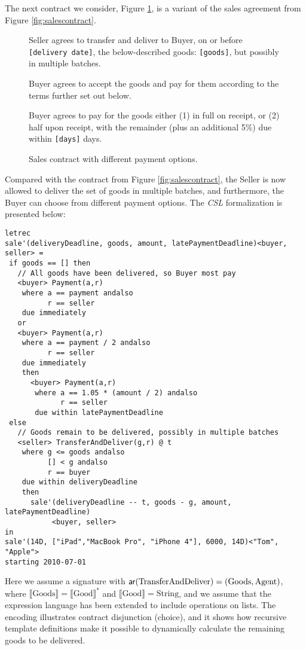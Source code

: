\documentclass[orivec,final]{llncs-href}
\newcommand{\tp}{\mathsf{ar}}
\newcommand{\dendom}[1]{\llbracket #1 \rrbracket}
\newcommand{\csl}{\textit{CSL}}
\newcounter{paragraphcounter}
\newenvironment{papercontract}
  {\begin{list}{\textbf{Paragraph \arabic{paragraphcounter}.}}{\usecounter{paragraphcounter}\leftmargin=0pt\itemindent=17pt\rightmargin=0pt\topsep=7pt\itemsep=2pt}}
  {\end{list}}
\newcommand{\contractparam}[1]{{\texttt{[#1]}}}
\begin{document}
The next contract we consider, Figure \ref{fig:salesdiff}, is a
variant of the sales agreement from Figure \ref{fig:salescontract}.
\begin{figure}[t]
  \begin{papercontract}
  \item Seller agrees to transfer and deliver to Buyer, on
    or before \contractparam{delivery date}, the below-described goods:
    \contractparam{goods}, but possibly in multiple batches.
  \item Buyer agrees to accept the goods and pay for
    them according to the terms further set out below.
  \item Buyer agrees to pay for the goods either (1) in
    full on receipt, or (2) half upon receipt, with the remainder (plus an
    additional 5\%) due within \contractparam{days} days.
  \end{papercontract}
  \caption{Sales contract with different payment options.}\label{fig:salesdiff}
\end{figure}
Compared with the contract from Figure \ref{fig:salescontract}, the
Seller is now allowed to deliver the set of goods in multiple batches,
and furthermore, the Buyer can choose from different payment
options. The \csl{} formalization is presented below:
\begin{lstlisting}[language=csl]
letrec
sale'(deliveryDeadline, goods, amount, latePaymentDeadline)<buyer, seller> =
 if goods == [] then
   // All goods have been delivered, so Buyer most pay
   <buyer> Payment(a,r)
    where a == payment andalso
          r == seller
    due immediately
   or
   <buyer> Payment(a,r)
    where a == payment / 2 andalso
          r == seller
    due immediately
    then
      <buyer> Payment(a,r)
       where a == 1.05 * (amount / 2) andalso
             r == seller
       due within latePaymentDeadline
 else
   // Goods remain to be delivered, possibly in multiple batches
   <seller> TransferAndDeliver(g,r) @ t
    where g <= goods andalso
          [] < g andalso
          r == buyer
    due within deliveryDeadline
    then
      sale'(deliveryDeadline -- t, goods - g, amount, latePaymentDeadline)
           <buyer, seller>
in
sale'(14D, ["iPad","MacBook Pro", "iPhone 4"], 6000, 14D)<"Tom", "Apple">
starting 2010-07-01
\end{lstlisting}
Here we assume a signature with $\tp(\mbox{TransferAndDeliver}) =
(\mbox{Goods},\ctpagent)$, where $\dendom{\mbox{Goods}} =
\dendom{\mbox{Good}}^*$ and $\dendom{\mbox{Good}} =
\mbox{String}$, and we assume that the expression language has been extended to
include operations on lists. The encoding illustrates contract disjunction
(choice), and it shows how recursive template definitions make it
possible to dynamically calculate the remaining goods to be
delivered.
\end{document}
